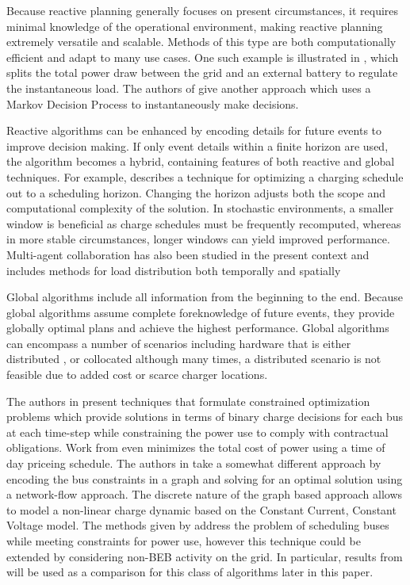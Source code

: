 \par Because reactive planning generally focuses on present circumstances, it requires minimal knowledge of the operational environment, making reactive planning extremely versatile and scalable.  Methods of this type are both computationally efficient and adapt to many use cases.  One such example is illustrated in \cite{cheng_smart_2020}, which splits the total power draw between the grid and an external battery to regulate the instantaneous load. The authors of \cite{Wang2019} give another approach which uses a Markov Decision Process to instantaneously make decisions.
\par Reactive algorithms can be enhanced by encoding details for future events to improve decision making. If only event details within a finite horizon are used, the algorithm becomes a hybrid, containing features of both reactive and global techniques. For example, \cite{bagherinezhad_spatio-temporal_2020} describes a technique for optimizing a charging schedule out to a scheduling horizon. Changing the horizon adjusts both the scope and computational complexity of the solution. In stochastic environments, a smaller window is beneficial as charge schedules must be frequently recomputed, whereas in more stable circumstances, longer windows can yield improved performance. Multi-agent collaboration has also been studied in the present context \cite{james2015coordinated} and includes methods for load distribution both temporally and spatially \cite{astero2016efficient, hu2016preventing}
\par Global algorithms include all information from the beginning to the end. Because global algorithms assume complete foreknowledge of future events, they provide globally optimal plans and achieve the highest performance. Global algorithms can encompass a number of scenarios including hardware that is either distributed \cite{Nimalsiri2020}, or collocated although many times, a distributed scenario is not feasible due to added cost or scarce charger locations.
\par The authors in \cite{el-taweel_incorporation_2019, Leou_optimal_2017, Wei2018, Rinalde_Mixed_2020, He_2019_Fast} present techniques that formulate constrained optimization problems which provide solutions in terms of binary charge decisions for each bus at each time-step while constraining the power use to comply with contractual obligations. Work from \cite{Zhou_2020_Collaborative} even minimizes the total cost of power using a time of day priceing schedule. The authors in \cite{whitaker_network_2021} take a somewhat different approach by encoding the bus constraints in a graph and solving for an optimal solution using a network-flow approach. The discrete nature of the graph based approach allows \cite{whitaker_network_2021} to model a non-linear charge dynamic based on the Constant Current, Constant Voltage model. The methods given by \cite{el-taweel_incorporation_2019, Leou_optimal_2017, whitaker_network_2021, He_2022_Battery} address the problem of scheduling buses while meeting constraints for power use, however this technique could be extended by considering non-BEB activity on the grid. In particular, results from \cite{He_2022_Battery} will be used as a comparison for this class of algorithms later in this paper.
